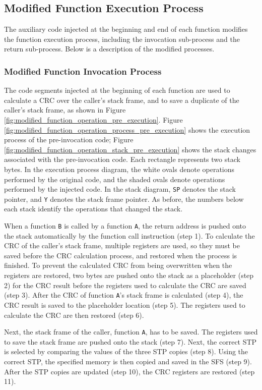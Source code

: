 \subsection{Modified Function Execution Process}

The auxiliary code injected at the beginning and end of each function modifies the function execution process, including the invocation sub-process and the return sub-process. Below is a description of the modified processes.

\subsubsection{Modified Function Invocation Process}

The code segments injected at the beginning of each function are used to calculate a CRC over the caller's stack frame, and to save a duplicate of the caller's stack frame, as shown in Figure \ref{fig:modified_function_operation_pre_execution}. Figure \ref{fig:modified_function_operation_process_pre_execution} shows the execution process of the pre-invocation code; Figure \ref{fig:modified_function_operation_stack_pre_execution} shows the stack changes associated with the pre-invocation code. Each rectangle represents two stack bytes. In the execution process diagram, the white ovals denote operations performed by the original code, and the shaded ovals denote operations performed by the injected code. In the stack diagram, \texttt{SP} denotes the stack pointer, and \texttt{Y} denotes the stack frame pointer. As before, the numbers below each stack identify the operations that changed the stack.

When a function \texttt{B} is called by a function \texttt{A}, the return address is pushed onto the stack automatically by the function call instruction (step 1). To calculate the CRC of the caller's stack frame, multiple registers are used, so they must be saved before the CRC calculation process, and restored when the process is finished. To prevent the calculated CRC from being overwritten when the registers are restored, two bytes are pushed onto the stack as a placeholder (step 2) for the CRC result before the registers used to calculate the CRC are saved (step 3). After the CRC of function \texttt{A}'s stack frame is calculated (step 4), the CRC result is saved to the placeholder location (step 5). The registers used to calculate the CRC are then restored (step 6).

Next, the stack frame of the caller, function \texttt{A}, has to be saved. The registers used to save the stack frame are pushed onto the stack (step 7). Next, the correct STP is selected by comparing the values of the three STP copies (step 8). Using the correct STP, the specified memory is then copied and saved in the SFS (step 9). After the STP copies are updated (step 10), the CRC registers are restored (step 11).

